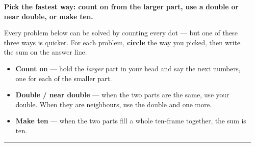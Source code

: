 \documentclass[12pt]{article}
\begin{document}

\noindent\textbf{Pick the fastest way: count on from the larger part, use a
double or near double, or make ten.}

\smallskip
\noindent\small Every problem below can be solved by counting every dot --- but
one of these three ways is quicker. For each problem, \textbf{circle} the way
you picked, then write the sum on the answer line.
\begin{itemize}[leftmargin=1.1cm, itemsep=1pt, topsep=2pt]
  \item \textbf{Count on} --- hold the \emph{larger} part in your head and say
        the next numbers, one for each of the smaller part.
  \item \textbf{Double / near double} --- when the two parts are the same, use
        your double. When they are neighbours, use the double and one more.
  \item \textbf{Make ten} --- when the two parts fill a whole ten-frame
        together, the sum is ten.
\end{itemize}
\normalsize

\noindent\rule{\linewidth}{0.4pt}





\end{document}
